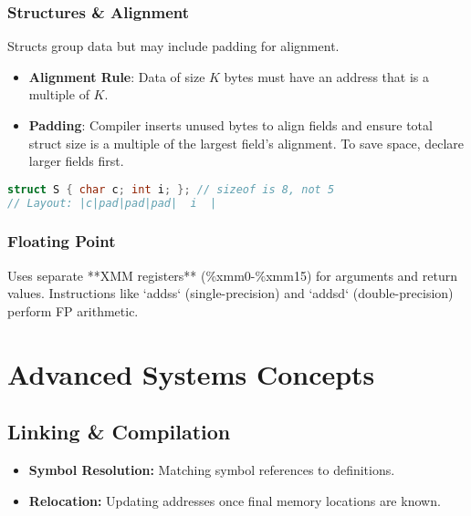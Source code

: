 \documentclass[10pt, twocolumn]{article}
\begin{document}
\subsubsection*{Structures \& Alignment}
Structs group data but may include padding for alignment.
\begin{itemize}
    \item \textbf{Alignment Rule}: Data of size $K$ bytes must have an address that is a multiple of $K$.
    \item \textbf{Padding}: Compiler inserts unused bytes to align fields and ensure total struct size is a multiple of the largest field's alignment. To save space, declare larger fields first.
\end{itemize}
\begin{lstlisting}[language=c, basicstyle=\ttfamily\tiny, caption=Alignment Padding]
struct S { char c; int i; }; // sizeof is 8, not 5
// Layout: |c|pad|pad|pad|  i  |
\end{lstlisting}

\subsubsection*{Floating Point}
Uses separate **XMM registers** (\%xmm0-\%xmm15) for arguments and return values. Instructions like `addss` (single-precision) and `addsd` (double-precision) perform FP arithmetic.

\section*{Advanced Systems Concepts}

\subsection*{Linking \& Compilation}
\begin{itemize}
    \item \textbf{Symbol Resolution:} Matching symbol references to definitions.
    \item \textbf{Relocation:} Updating addresses once final memory locations are known.
\end{itemize}
\end{document}
